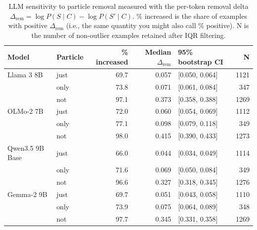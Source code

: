 \begin{table}[t]
\centering
\small
\begin{tabular}{llrrlr}
\toprule
Model & Particle & \% increased & Median $\Delta_{\mathrm{rem}}$ & 95\% bootstrap CI & N \\
\midrule
Llama 3 8B & just & 69.7 & 0.057 & [0.050, 0.064] & 1121 \\
 & only & 73.8 & 0.071 & [0.061, 0.084] & 347 \\
 & not & 97.1 & 0.373 & [0.358, 0.388] & 1269 \\
OLMo-2 7B & just & 72.0 & 0.060 & [0.054, 0.069] & 1112 \\
 & only & 77.1 & 0.098 & [0.079, 0.118] & 349 \\
 & not & 98.0 & 0.415 & [0.390, 0.433] & 1273 \\
Qwen3.5 9B Base & just & 66.0 & 0.044 & [0.034, 0.049] & 1114 \\
 & only & 71.6 & 0.069 & [0.050, 0.084] & 349 \\
 & not & 96.6 & 0.327 & [0.318, 0.345] & 1276 \\
Gemma-2 9B & just & 69.7 & 0.051 & [0.043, 0.058] & 1110 \\
 & only & 73.9 & 0.075 & [0.064, 0.089] & 348 \\
 & not & 97.7 & 0.345 & [0.331, 0.358] & 1269 \\
\bottomrule
\end{tabular}
\caption{LLM sensitivity to particle removal measured with the per-token removal delta $\Delta_{\mathrm{rem}} = \log P(S \mid C) - \log P(S' \mid C)$. \% increased is the share of examples with positive $\Delta_{\mathrm{rem}}$ (i.e., the same quantity you might also call \% positive). N is the number of non-outlier examples retained after IQR filtering. }
\label{tab:particle-removal-sensitivity}
\end{table}
